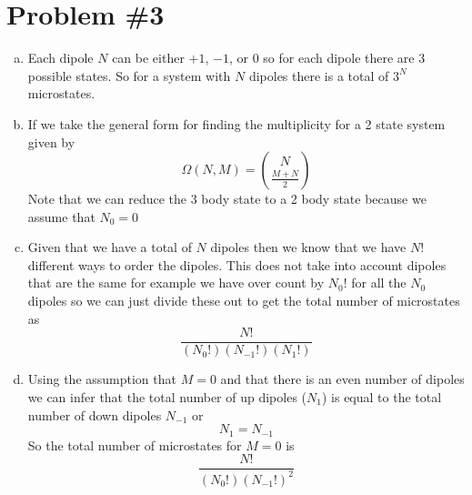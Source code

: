 \documentclass[11pt]{article}
\numberwithin{equation}{section}
\begin{document}
\section{Problem \#3}
\begin{enumerate}[(a)]
\item
Each dipole $N$ can be either $+1$, $-1$, or $0$ so for each dipole there are 3 possible states. So for a system with $N$ dipoles there is a total of $3^N$ microstates.

\item
If we take the general form for finding the multiplicity for a 2 state system given by
$$\Omega(N,M) = {N\choose\frac{M+N}{2}}$$
Note that we can reduce the 3 body state to a 2 body state because we assume that $N_0=0$

\item
Given that we have a total of $N$ dipoles then we know that we have $N!$ different ways to order the dipoles. This does not take into account dipoles that are the same for example we have over count by $N_0!$ for all the $N_0$ dipoles so we can just divide these out to get the total number of microstates as
$$\frac{N!}{(N_0!)(N_{-1}!)(N_1!)}$$


\item
Using the assumption that $M=0$ and that there is an even number of dipoles we can infer that the total number of up dipoles ($N_1$) is equal to the total number of down dipoles $N_{-1}$ or
$$N_1 = N_{-1}$$
So the total number of microstates for $M=0$ is 
$$\frac{N!}{(N_0!)(N_{-1}!)^2}$$


\end{enumerate}
\end{document}
